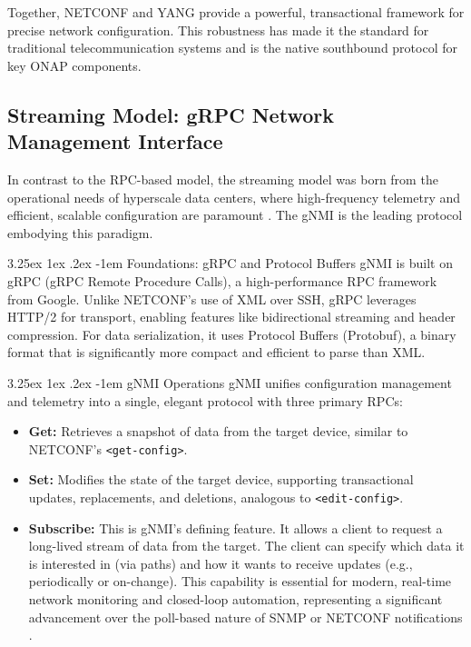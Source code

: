 \documentclass[12pt, a4paper, reqno, oneside]{book}
\makeatletter
\renewcommand\paragraph{\@startsection{paragraph}{5}{\z@}%
  {3.25ex \@plus1ex \@minus.2ex}%
  {-1em}%
  {\normalfont\normalsize\bfseries}}
\makeatother
\begin{document}
Together, NETCONF and YANG provide a powerful, transactional framework for precise network configuration. This robustness has made it the standard for traditional telecommunication systems and is the native southbound protocol for key ONAP components.

\subsection{Streaming Model: gRPC Network Management Interface}
\label{sec:streaming_model}

In contrast to the RPC-based model, the streaming model was born from the operational needs of hyperscale data centers, where high-frequency telemetry and efficient, scalable configuration are paramount \cite{singh2015jupiter}. The gNMI is the leading protocol embodying this paradigm.

\paragraph{Foundations: gRPC and Protocol Buffers}
gNMI is built on gRPC (gRPC Remote Procedure Calls), a high-performance RPC framework from Google. Unlike NETCONF's use of XML over SSH, gRPC leverages HTTP/2 for transport, enabling features like bidirectional streaming and header compression. For data serialization, it uses Protocol Buffers (Protobuf), a binary format that is significantly more compact and efficient to parse than XML.

\paragraph{gNMI Operations}
gNMI unifies configuration management and telemetry into a single, elegant protocol with three primary RPCs:
\begin{itemize}
    \item \textbf{Get:} Retrieves a snapshot of data from the target device, similar to NETCONF's \texttt{<get-config>}.
    \item \textbf{Set:} Modifies the state of the target device, supporting transactional updates, replacements, and deletions, analogous to \texttt{<edit-config>}.
    \item \textbf{Subscribe:} This is gNMI's defining feature. It allows a client to request a long-lived stream of data from the target. The client can specify which data it is interested in (via paths) and how it wants to receive updates (e.g., periodically or on-change). This capability is essential for modern, real-time network monitoring and closed-loop automation, representing a significant advancement over the poll-based nature of SNMP or NETCONF notifications \cite{boutaba2018survey}.
\end{itemize}
\end{document}
